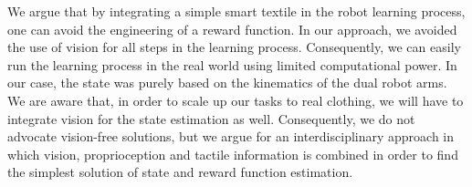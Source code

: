 \documentclass[applsci,article,accept,moreauthors,pdftex]{Definitions/mdpi}
\begin{document}
We argue that by integrating a simple smart textile in the robot learning process, one can avoid the engineering of a reward function. In our approach, we avoided the use of vision for all steps in the learning process. Consequently, we can easily run the learning process in the real world using limited computational power. In our case, the state was purely based on the kinematics of the dual robot arms. We are aware that, in order to scale up our tasks to real clothing, we will have to integrate vision for the state estimation as well. Consequently, we do not advocate vision-free solutions, but we argue for an interdisciplinary approach in which vision, proprioception and tactile information is combined in order to find the simplest solution of state and reward function estimation.

\end{document}
